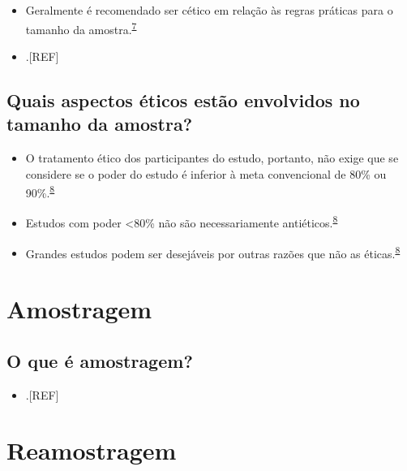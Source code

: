 \documentclass[
  a4paper,
]{book}
\providecommand{\tightlist}{%
  \setlength{\itemsep}{0pt}\setlength{\parskip}{0pt}}
\begin{document}
\begin{itemize}
\item
  Geralmente é recomendado ser cético em relação às regras práticas para o tamanho da amostra.\textsuperscript{\protect\hyperlink{ref-van2022}{7}}
\item
  .{[}REF{]}
\end{itemize}

\hypertarget{quais-aspectos-uxe9ticos-estuxe3o-envolvidos-no-tamanho-da-amostra}{%
\subsection{Quais aspectos éticos estão envolvidos no tamanho da amostra?}\label{quais-aspectos-uxe9ticos-estuxe3o-envolvidos-no-tamanho-da-amostra}}

\begin{itemize}
\item
  O tratamento ético dos participantes do estudo, portanto, não exige que se considere se o poder do estudo é inferior à meta convencional de 80\% ou 90\%.\textsuperscript{\protect\hyperlink{ref-Bacchetti2005}{8}}
\item
  Estudos com poder \textless80\% não são necessariamente antiéticos.\textsuperscript{\protect\hyperlink{ref-Bacchetti2005}{8}}
\item
  Grandes estudos podem ser desejáveis por outras razões que não as éticas.\textsuperscript{\protect\hyperlink{ref-Bacchetti2005}{8}}
\end{itemize}

\hypertarget{amostragem}{%
\section{Amostragem}\label{amostragem}}

\hypertarget{o-que-uxe9-amostragem}{%
\subsection{O que é amostragem?}\label{o-que-uxe9-amostragem}}

\begin{itemize}
\tightlist
\item
  .{[}REF{]}
\end{itemize}

\hypertarget{reamostragem}{%
\section{Reamostragem}\label{reamostragem}}
\end{document}
